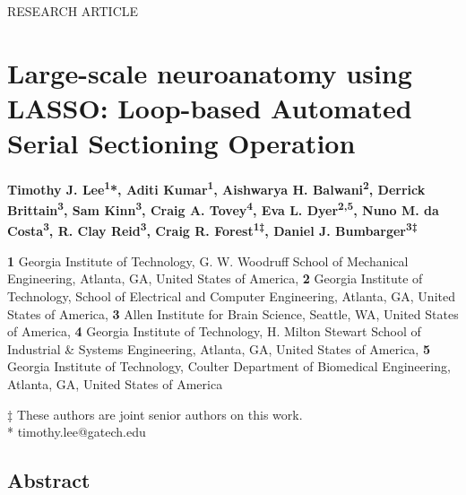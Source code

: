 \documentclass{article}
\begin{document}

\noindent RESEARCH ARTICLE

\section*{Large-scale neuroanatomy using LASSO: Loop-based Automated Serial Sectioning Operation}

\noindent\textbf{Timothy J. Lee\textsuperscript{1}*, Aditi Kumar\textsuperscript{1}, Aishwarya H. Balwani\textsuperscript{2}, Derrick Brittain\textsuperscript{3}, Sam Kinn\textsuperscript{3}, Craig A. Tovey\textsuperscript{4}, Eva L. Dyer\textsuperscript{2,5}, Nuno M. da Costa\textsuperscript{3}, R. Clay Reid\textsuperscript{3}, Craig R. Forest\textsuperscript{1‡}, Daniel J. Bumbarger\textsuperscript{3‡}}

\noindent\textbf{1} Georgia Institute of Technology, G. W. Woodruff School of Mechanical Engineering, Atlanta, GA, United States of America, \textbf{2} Georgia Institute of Technology, School of Electrical and Computer Engineering, Atlanta, GA, United States of America, \textbf{3} Allen Institute for Brain Science, Seattle, WA, United States of America, \textbf{4} Georgia Institute of Technology, H. Milton Stewart School of Industrial \& Systems Engineering, Atlanta, GA, United States of America, \textbf{5} Georgia Institute of Technology, Coulter Department of Biomedical Engineering, Atlanta, GA, United States of America

\noindent ‡ These authors are joint senior authors on this work.\\
* timothy.lee@gatech.edu

\subsection*{Abstract}
\end{document}
